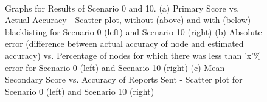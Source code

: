 \documentclass[journal]{IEEEtran}
\begin{document}
\begin{figure}[!ht]
{	} \\\vfill
	\hfill
	\caption{Graphs for Results of Scenario 0 and 10. (a) Primary Score vs. Actual Accuracy - Scatter plot, without (above) and with (below) blacklisting for Scenario 0 (left) and Scenario 10 (right) (b) Absolute error (difference between actual accuracy of node and estimated accuracy) vs. Percentage of nodes for which there was less than 'x'\% error for Scenario 0 (left) and Scenario 10 (right) (c) Mean Secondary Score vs. Accuracy of Reports Sent - Scatter plot for Scenario 0 (left) and Scenario 10 (right)}
	\label{fig:apdx:ev0}
\end{figure}
\end{document}
